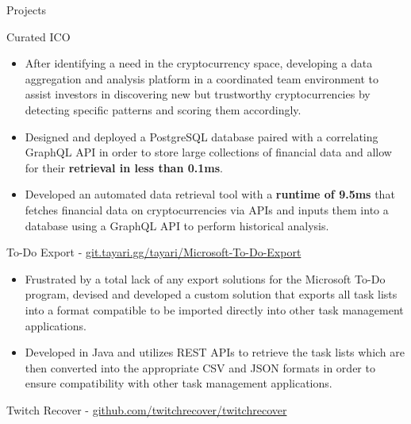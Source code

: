 \documentclass{article}
\newlength{\tabin}
\newlength{\secsep}
\newcommand{\lineunder}{\vspace*{-8pt} \\ \hspace*{-6pt} \hrulefill \\ \vspace*{-15pt}}
\newenvironment{tabbedsection}[1]{
  \begin{list}{}{
      \setlength{\itemsep}{0pt}
      \setlength{\labelsep}{0pt}
      \setlength{\labelwidth}{0pt}
      \setlength{\leftmargin}{\tabin}
      \setlength{\rightmargin}{\tabin}
      \setlength{\listparindent}{0pt}
      \setlength{\parsep}{0pt}
      \setlength{\parskip}{0pt}
      \setlength{\partopsep}{0pt}
      \setlength{\topsep}{#1}
    }
  \item[]
}{\end{list}}
\newenvironment{resume_section}[1]{
  \filbreak
  \vspace{2\secsep}
  \textsc{\color{blue}\large#1}
  \lineunder
  \begin{tabbedsection}{\secsep}
}{\end{tabbedsection}}
\newenvironment{resume_subsection}[2][]{
  \textbf{\color{BlueViolet}#2} \hfill {\normalsize #1} \hspace{-5em} 
  \begin{tabbedsection}{0.5\secsep}
}{\end{tabbedsection}}
\newenvironment{subitems}{
  \renewcommand{\labelitemi}{-}
  \begin{itemize}
      \setlength{\labelsep}{1em}
}{\end{itemize}}
\begin{document}
\vspace{2\secsep}

\begin{resume_section}{Projects}
	\begin{resume_subsection}{Curated ICO}
		\begin{subitems}
            \item After identifying a need in the cryptocurrency space, developing a data aggregation and analysis platform in a coordinated team environment to assist investors in discovering new but trustworthy cryptocurrencies by detecting specific patterns and scoring them accordingly.
            \item Designed and deployed a PostgreSQL database paired with a correlating GraphQL API in order to store large collections of financial data and allow for their \textbf{retrieval in less than 0.1ms}. 
            \item Developed an automated data retrieval tool with a \textbf{runtime of 9.5ms} that fetches financial data on cryptocurrencies via APIs and inputs them into a database using a GraphQL API to perform historical analysis. 
		\end{subitems}
	\end{resume_subsection}
	\vspace{2\secsep}
	\begin{resume_subsection}[(February 2021)]{To-Do Export - \faGitlab \hspace{0.01cm} \href{https://git.tayari.gg/tayari/Microsoft-To-Do-Export}{git.tayari.gg/tayari/Microsoft-To-Do-Export}}
  		\begin{subitems} 
            \item Frustrated by a total lack of any export solutions for the Microsoft To-Do program, devised and developed a custom solution that exports all task lists into a format compatible to be imported directly into other task management applications.
  			\item Developed in Java and utilizes REST APIs to retrieve the task lists which are then converted into the appropriate CSV and JSON formats in order to ensure compatibility with other task management applications.
    		\end{subitems}
  	\end{resume_subsection}
  	\vspace{2\secsep}
	\begin{resume_subsection}{Twitch Recover - \faGithub \hspace{0.01cm} \href{https://github.com/twitchrecover/twitchrecover}{github.com/twitchrecover/twitchrecover}}  

\end{resume_subsection}
\end{resume_section}
\end{document}
